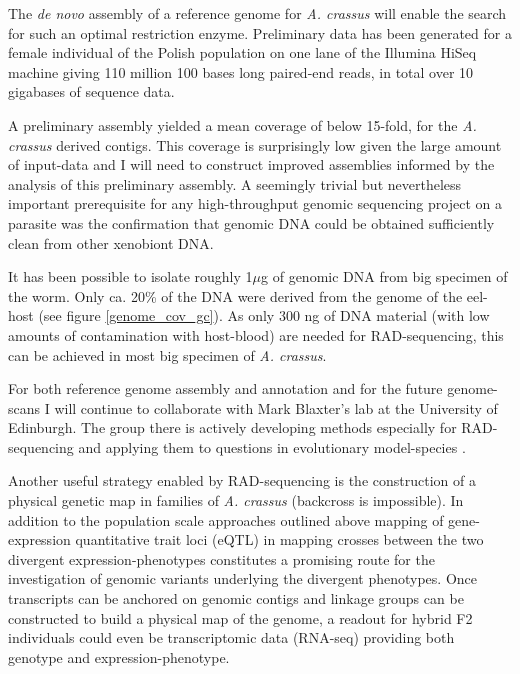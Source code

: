 The \textit{de novo} assembly of a reference genome for
\textit{A. crassus} will enable the search for such an optimal
restriction enzyme. Preliminary data has been generated for a female
individual of the Polish population on one lane of the Illumina HiSeq
machine giving 110 million 100 bases long paired-end reads, in total
over 10 gigabases of sequence data.

A preliminary assembly yielded a mean coverage of below 15-fold, for
the \textit{A. crassus} derived contigs. This coverage is surprisingly
low given the large amount of input-data and I will need to construct
improved assemblies informed by the analysis of this preliminary
assembly. A seemingly trivial but nevertheless important prerequisite
for any high-throughput genomic sequencing project on a parasite was
the confirmation that genomic DNA could be obtained sufficiently clean
from other xenobiont DNA.


It has been possible to isolate roughly 1$\mu$g of genomic DNA from
big specimen of the worm. Only ca. 20\% of the DNA were derived from
the genome of the eel-host (see figure \ref{genome_cov_gc}). As only
300 ng of DNA material (with low amounts of contamination with
host-blood) are needed for RAD-sequencing, this can be achieved in most
big specimen of \textit{A. crassus}.

For both reference genome assembly and annotation and for the future
genome-scans I will continue to collaborate with Mark Blaxter's lab at
the University of Edinburgh. The group there is actively developing
methods especially for RAD-sequencing and applying them to questions
in evolutionary model-species \cite{pmid21681211}.

Another useful strategy enabled by RAD-sequencing is the construction
of a physical genetic map in families of \textit{A. crassus}
(backcross is impossible). In addition to the population scale
approaches outlined above mapping of gene-expression quantitative
trait loci (eQTL) in mapping crosses between the two divergent
expression-phenotypes constitutes a promising route for the
investigation of genomic variants underlying the divergent
phenotypes. Once transcripts can be anchored on genomic contigs and
linkage groups can be constructed to build a physical map of the
genome, a readout for hybrid F2 individuals could even be
transcriptomic data (RNA-seq) providing both genotype and
expression-phenotype.

